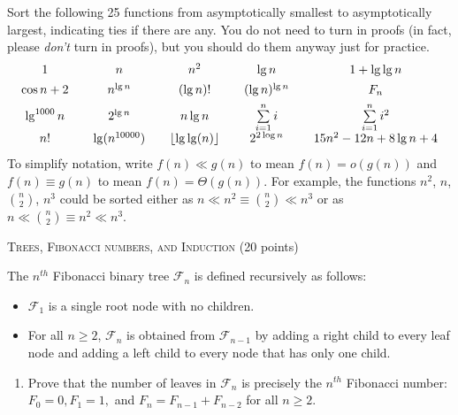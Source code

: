 \documentclass[11pt]{article}
\begin{document}
\begin{problems}
    Sort the following 25 functions from asymptotically
    smallest to asymptotically largest, indicating ties if
    there are any.  You do not need to turn in proofs (in
    fact, please \emph{don't} turn in proofs), but you
    should do them anyway just for practice.
    \[
    \begin{array}{c@{\qquad}c@{\qquad}c@{\qquad}c@{\qquad}c}
        1
        &       n
        &       n^2
        &       \lg n
        &       1 + \lg \lg n
        \\[1ex]
        \cos n + 2
        &       n^{\lg n}
        &       (\lg n)!
        &       (\lg n)^{\lg n}
        &       F_n
        \\[1ex] \lg^{1000} n
        &       2^{\lg n}
        &       n \lg n
        &       \Sum_{i=1}^{n} {i}
        &       \Sum_{i=1}^{n} {i^2}
        \\[1ex] n!
        &       \lg (n^{10000})
        &       \floor{\lg \lg (n)}
        &       2^{2 \log n}
        &       15n^2 - 12n + 8 \lg n + 4
    \end{array}
    \]
    To simplify notation, write $f(n) \ll g(n)$ to mean $f(n) =
    o(g(n))$ and $f(n) \equiv g(n)$ to mean $f(n) = \Theta(g(n))$.
    For example, the functions $n^2$, $n$, $\binom{n}{2}$, $n^3$ could
    be sorted either as $n \ll n^2 \equiv \binom{n}{2} \ll n^3$ or as
    $n \ll \binom{n}{2} \equiv n^2 \ll n^3$. 


    \item \textsc{Trees, Fibonacci numbers, and Induction} \hfill (20 points)

    The $n^{th}$ Fibonacci binary tree $\mathcal{F}_n$ is defined
    recursively as follows:

    \begin{itemize}
    \item $\mathcal{F}_1$ is a single root node with no children.
    \item For all $n \ge2$, $\mathcal{F}_n$ is obtained from
    $\mathcal{F}_{n-1}$ by adding a right child to every leaf node
    and adding a left child to every node that has only one child.
    \end{itemize}

    \begin{enumerate}
    \item Prove that the number of leaves in $\mathcal{F}_n$ is
    precisely the $n^{th}$ Fibonacci number: $F_0 = 0, F_1 = 1,$ and
    $F_n = F_{n-1} + F_{n-2}$ for all $n \ge 2$.


\end{enumerate}
\end{problems}
\end{document}

